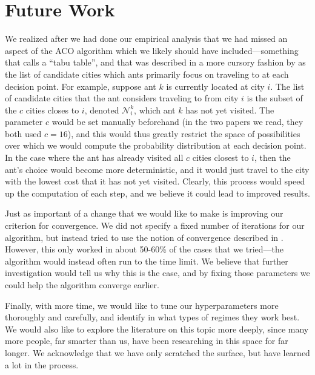\section{Future Work}
We realized after we had done our empirical analysis that we had missed an
aspect of the ACO algorithm which we likely should have included---something that
\cite{Li2015EfficiencyIO} calls a ``tabu table'', and that was described in a more
cursory fashion by \cite{Sttzle2000MAXMINAS} as the list of candidate cities which
ants primarily focus on traveling to at each decision point. For example, suppose
ant $k$ is currently located at city $i$. The list of candidate cities that the ant
considers traveling to from city $i$ is the subset of the $c$ cities closes to $i$,
denoted $\mathcal{N}_i^k$, which ant $k$ has not yet visited. The parameter $c$ would
be set manually beforehand (in the two papers we read, they both used $c=16$), and 
this would thus greatly restrict the space of possibilities over which we would compute
the probability distribution at each decision point. In the case where the ant has already
visited all $c$ cities closest to $i$, then the ant's choice would become more deterministic,
and it would just travel to the city with the lowest cost that it has not yet visited. Clearly, this
process would speed up the computation of each step, and we believe it could lead to improved
results.

Just as important of a change that we would like to make is improving our criterion for convergence.
We did not specify a fixed number of iterations for our algorithm, but instead tried to use
the notion of convergence described in \cite{Sttzle2000MAXMINAS}. However, this only worked in about
50-60\% of the cases that we tried---the algorithm would instead often run to the time limit. We 
believe that further investigation would tell us why this is the case, and by fixing those parameters
we could help the algorithm converge earlier.

Finally, with more time, we would like to tune our hyperparameters more thoroughly and carefully,
and identify in what types of regimes they work best. We would also like to explore the
literature on this topic more deeply, since many more people, far smarter than us, have
been researching in this space for far longer. We acknowledge that we have only scratched the
surface, but have learned a lot in the process.








